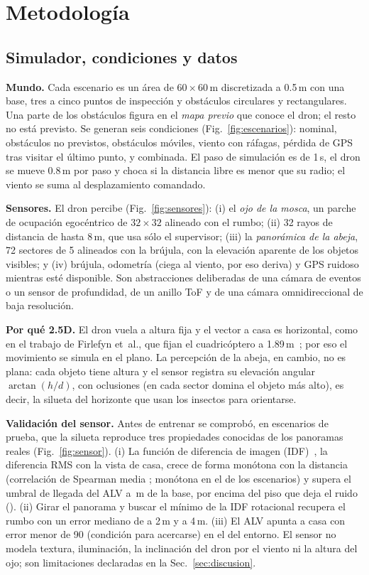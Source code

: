 \section{Metodología}
\subsection{Simulador, condiciones y datos}
\textbf{Mundo.} Cada escenario es un área de $60\times60$\,m discretizada a 0.5\,m con una
base, tres a cinco puntos de inspección y obstáculos circulares y rectangulares. Una parte de
los obstáculos figura en el \emph{mapa previo} que conoce el dron; el resto no está previsto.
Se generan seis condiciones (Fig.~\ref{fig:escenarios}): nominal, obstáculos no previstos,
obstáculos móviles, viento con ráfagas, pérdida de GPS tras visitar el último punto, y
combinada. El paso de simulación es de 1\,s, el dron se mueve 0.8\,m por paso y choca si la
distancia libre es menor que su radio; el viento se suma al desplazamiento comandado.

\textbf{Sensores.} El dron percibe (Fig.~\ref{fig:sensores}): (i) el \emph{ojo de la mosca},
un parche de ocupación egocéntrico de $32\times32$ alineado con el rumbo; (ii) 32 rayos de
distancia de hasta 8\,m, que usa sólo el supervisor; (iii) la \emph{panorámica de la abeja},
72 sectores de 5\textdegree{} alineados con la brújula, con la elevación aparente de los
objetos visibles; y (iv) brújula, odometría (ciega al viento, por eso deriva) y GPS ruidoso
mientras esté disponible. Son abstracciones deliberadas de una cámara de eventos o un sensor
de profundidad, de un anillo ToF y de una cámara omnidireccional de baja resolución.

\textbf{Por qué 2.5D.} El dron vuela a altura fija y el vector a casa es horizontal, como en
el trabajo de Firlefyn et~al., que fijan el cuadricóptero a 1.89\,m~\cite{firlefyn2024}; por
eso el movimiento se simula en el plano. La percepción de la abeja, en cambio, no es plana:
cada objeto tiene altura y el sensor registra su elevación angular $\arctan(h/d)$, con
oclusiones (en cada sector domina el objeto más alto), es decir, la silueta del horizonte que
usan los insectos para orientarse.

\textbf{Validación del sensor.} Antes de entrenar se comprobó, en
\nfbIdfEscenarios{} escenarios de prueba, que la silueta reproduce tres propiedades conocidas
de los panoramas reales (Fig.~\ref{fig:sensor}). (i) La función de diferencia de imagen
(IDF)~\cite{zeil2003}, la diferencia RMS con la vista de casa, crece de forma monótona con la
distancia (correlación de Spearman media \nfbIdfSpearman{}; monótona en el \nfbIdfMonotonas{}
de los escenarios) y supera el umbral de llegada del ALV a \nfbIdfRadioLlegada{}\,m de la
base, por encima del piso que deja el ruido (\nfbIdfPisoRuido{}). (ii) Girar el panorama y
buscar el mínimo de la IDF rotacional recupera el rumbo con un error mediano de
\nfbRumboErrorDos{} a 2\,m y \nfbRumboErrorCuatro{} a 4\,m. (iii) El ALV apunta a casa con
error menor de 90\textdegree{} (condición para acercarse) en el \nfbAlvCaptura{} del entorno.
El sensor no modela textura, iluminación, la inclinación del dron por el viento ni la altura
del ojo; son limitaciones declaradas en la Sec.~\ref{sec:discusion}.


